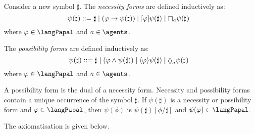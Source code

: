 \begin{definition}
Consider a new symbol $\sharp$. The {\em necessity forms} are defined inductively as: $$\psi(\sharp) ::= \sharp \mid (\phi \implies \psi(\sharp)) \mid \announceA{\phi} \psi(\sharp) \mid \knows[\agentA] \psi(\sharp)$$ where $\phi \in \langPapal$ and $\agentA \in \agents$.

The {\em possibility forms} are defined inductively as: $$\psi(\sharp) ::= \sharp \mid (\phi \land \psi(\sharp)) \mid \announceE{\phi} \psi(\sharp) \mid \suspects[\agentA] \psi(\sharp)$$ where $\phi \in \langPapal$ and $\agentA \in \agents$.
\end{definition}

A possibility form is the dual of a necessity form. Necessity and possibility forms contain a unique occurrence of the symbol $\sharp$. If $\psi(\sharp)$ is a necessity or possibility form and $\phi \in \langPapal$, then $\psi(\phi)$ is $\psi(\sharp)[\phi/\sharp]$ and $\psi(\phi) \in \langPapal$.

The axiomatisation \axiomPapalS{} is given below.

